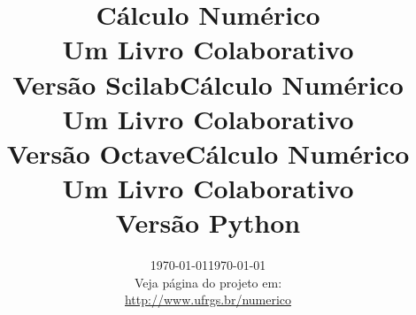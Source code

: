 \documentclass[12pt]{book}
\begin{document}
\frontmatter

\ifisscilab
\title{Cálculo Numérico\\\small{Um Livro Colaborativo}\\\small{Versão Scilab}}
\fi
\ifisoctave
\title{Cálculo Numérico\\\small{Um Livro Colaborativo}\\\small{Versão Octave}}
\fi
\ifispython
\title{Cálculo Numérico\\\small{Um Livro Colaborativo}\\\small{Versão Python}}
\fi
\author{}
\ifishtml
\date{\today}
\else
\date{\today\vspace{1cm}\\\small{Veja página do projeto em:\\
\url{http://www.ufrgs.br/numerico}
}
}
\fi
\ifishtml
\else
{}
\fi

\ifishtml
\else
\AddToShipoutPicture*{\BackgroundPic}
\fi
\maketitle






\ifisslide
\tableofcontents
\else
\ifishtml
\else
\tableofcontents
{}
\fi
\fi

\mainmatter







%




%

%




%
%




\ifisscilab
\appendix

\fi
\ifisoctave
\appendix

\fi
\ifispython
\appendix

\fi
\end{document}
